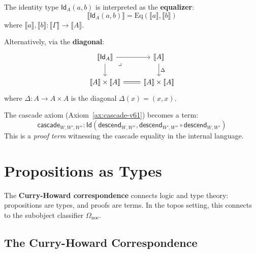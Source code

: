 \begin{definition}
\label{def:identity-categorical}
The identity type $\mathsf{Id}_A(a, b)$ is interpreted as the \textbf{equalizer}:
\[
  \llbracket \mathsf{Id}_A(a, b) \rrbracket = \mathrm{Eq}(\llbracket a \rrbracket, \llbracket b \rrbracket)
\]
where $\llbracket a \rrbracket, \llbracket b \rrbracket : \llbracket \Gamma \rrbracket \to \llbracket A \rrbracket$.

Alternatively, via the \textbf{diagonal}:
\[
\begin{tikzcd}
  \llbracket \mathsf{Id}_A \rrbracket \arrow[r] \arrow[d] \arrow[dr, phantom, "\lrcorner", very near start]
  & \llbracket A \rrbracket \arrow[d, "\Delta"] \\
  \llbracket A \rrbracket \times \llbracket A \rrbracket \arrow[r, equal]
  & \llbracket A \rrbracket \times \llbracket A \rrbracket
\end{tikzcd}
\]
where $\Delta : A \to A \times A$ is the diagonal $\Delta(x) = (x, x)$.
\end{definition}

\begin{example}
\label{ex:acbe-cascade-equality}
The cascade axiom (Axiom~\ref{ax:cascade-v61}) becomes a term:
\[
  \mathsf{cascade}_{W,W',W''} : \mathsf{Id}(\mathsf{descend}_{W,W''}, \mathsf{descend}_{W',W''} \circ \mathsf{descend}_{W,W'})
\]
This is a \emph{proof term} witnessing the cascade equality in the internal language.
\end{example}

\section{Propositions as Types}
\label{sec:propositions-as-types}

The \textbf{Curry-Howard correspondence} connects logic and type theory:
propositions are types, and proofs are terms. In the topos setting, this
connects to the subobject classifier $\Omega_{\mathrm{noe}}$.

\subsection{The Curry-Howard Correspondence}
\label{subsec:curry-howard}

